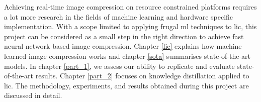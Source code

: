 Achieving real-time image compression on resource constrained platforms requires a lot more research in the fields of machine learning and hardware specific implementation. With a scope limited to applying frugal \acrshort{ml} techniques to \acrshort{lic}, this project can be considered as a small step in the right direction to achieve fast neural network based image compression. Chapter \ref{lic} explains how machine learned image compression works and chapter \ref{sota} summarises state-of-the-art models. In chapter \ref{part_1}, we assess our ability to replicate and evaluate state-of-the-art results. Chapter \ref{part_2} focuses on knowledge distillation applied to \acrshort{lic}. The methodology, experiments, and results obtained during this project are discussed in detail.